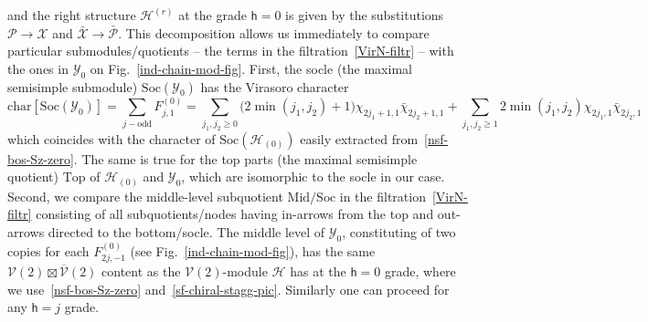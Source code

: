 \documentclass[11pt]{article}
\newcommand{\Soc}{\mathrm{Soc}}
\newcommand{\Top}{\mathrm{Top}}
\newcommand{\Mid}{\mathrm{Mid}}
\newcommand{\Char}{\mathrm{char}}
\newcommand{\h}{\mathsf{h}}
\newcommand{\Vir}{\mathcal{V}}
\newcommand{\VirN}{\boldsymbol{\mathcal{V}}}
\newcommand{\interP}[1]{\mathscr{Y}_{#1}}
\newcommand{\bimnch}{\boldsymbol{\mathcal{H}}}
\newcommand{\VX}{\mathcal{X}}
\newcommand{\VP}{\mathcal{P}}
\theoremstyle{definition}
\begin{document}
and the right structure $\bimnch^{(r)}$ at the grade $\h=0$ is given
by the substitutions $\VP\to\VX$ and $\bar{\VX}\to\bar{\VP}$. This
decomposition allows us  immediately to compare particular
submodules/quotients -- the terms in the filtration~\eqref{VirN-filtr} -- with the ones in $\interP{0}$ on
Fig.~\ref{ind-chain-mod-fig}. First, the socle (the maximal semisimple
submodule) $\Soc(\interP{0})$ has the Virasoro character
\begin{equation*}
\Char\left[\Soc(\interP{0})\right] = \sum_{j-\mathrm{odd}} F^{(0)}_{j,1} =
\sum_{j_1,j_2\geq0}\bigl(2\min(j_1,j_2)+1\bigr)\chi_{2j_1+1,1}\bar{\chi}_{2j_2+1,1} +
\sum_{j_1,j_2\geq1}2\min(j_1,j_2)\chi_{2j_1,1}\bar{\chi}_{2j_2,1}
\end{equation*}
which coincides with the character of $\Soc(\bimnch_{(0)})$ easily
extracted from~\eqref{nsf-bos-Sz-zero}. The same is true for the top
parts (the maximal semisimple quotient) $\Top$ of $\bimnch_{(0)}$ and
$\interP{0}$, which are isomorphic to the socle in our case. Second, we
compare the middle-level subquotient $\Mid/\Soc$ in the
filtration~\eqref{VirN-filtr} consisting of all subquotients/nodes
having in-arrows from the top and out-arrows directed to the
bottom/socle. The middle level of $\interP{0}$, constituting of two
copies for each $F^{(0)}_{2j,-1}$ (see Fig.~\ref{ind-chain-mod-fig}),
has the same $\Vir(2)\boxtimes\overline{\Vir}(2)$ content
as the $\VirN(2)$-module $\bimnch$ has at the $\h=0$ grade, where we
use~\eqref{nsf-bos-Sz-zero} and~\eqref{sf-chiral-stagg-pic}. Similarly
one can proceed for any $\h=j$ grade.
\end{document}
